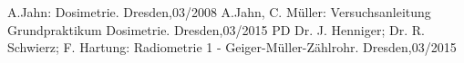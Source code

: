 \begin{thebibliography}{99}
 A.Jahn: Dosimetrie. Dresden,03/2008 
 A.Jahn, C. Müller: Versuchsanleitung Grundpraktikum Dosimetrie. Dresden,03/2015
 PD Dr. J. Henniger; Dr. R. Schwierz; F. Hartung: Radiometrie 1 - Geiger-Müller-Zählrohr. Dresden,03/2015

\end{thebibliography}